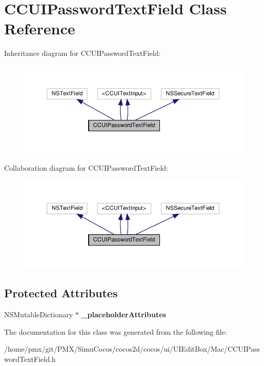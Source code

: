 \hypertarget{interfaceCCUIPasswordTextField}{}\section{C\+C\+U\+I\+Password\+Text\+Field Class Reference}
\label{interfaceCCUIPasswordTextField}


Inheritance diagram for C\+C\+U\+I\+Password\+Text\+Field\+:
\nopagebreak
\begin{figure}[H]
\begin{center}
\leavevmode
\includegraphics[width=350pt]{interfaceCCUIPasswordTextField__inherit__graph}
\end{center}
\end{figure}


Collaboration diagram for C\+C\+U\+I\+Password\+Text\+Field\+:
\nopagebreak
\begin{figure}[H]
\begin{center}
\leavevmode
\includegraphics[width=350pt]{interfaceCCUIPasswordTextField__coll__graph}
\end{center}
\end{figure}
\subsection*{Protected Attributes}
\begin{DoxyCompactItemize}
\item 
\mbox{\label{interfaceCCUIPasswordTextField_ab7a78a21128b133b70c8dfdf51e96a77}} 
N\+S\+Mutable\+Dictionary $\ast$ {\bfseries \+\_\+placeholder\+Attributes}
\end{DoxyCompactItemize}


The documentation for this class was generated from the following file\+:\begin{DoxyCompactItemize}
\item 
/home/pmx/git/\+P\+M\+X/\+Simu\+Cocos/cocos2d/cocos/ui/\+U\+I\+Edit\+Box/\+Mac/C\+C\+U\+I\+Password\+Text\+Field.\+h\end{DoxyCompactItemize}
